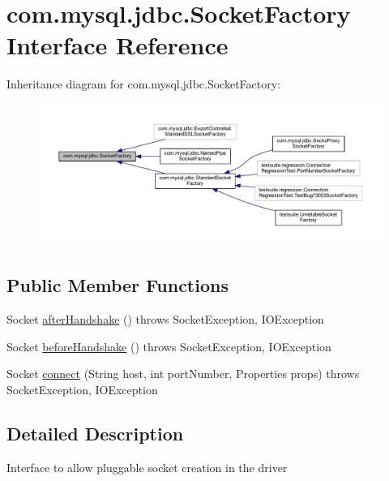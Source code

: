 \hypertarget{interfacecom_1_1mysql_1_1jdbc_1_1_socket_factory}{}\section{com.\+mysql.\+jdbc.\+Socket\+Factory Interface Reference}
\label{interfacecom_1_1mysql_1_1jdbc_1_1_socket_factory}


Inheritance diagram for com.\+mysql.\+jdbc.\+Socket\+Factory\+:
\nopagebreak
\begin{figure}[H]
\begin{center}
\leavevmode
\includegraphics[width=350pt]{interfacecom_1_1mysql_1_1jdbc_1_1_socket_factory__inherit__graph}
\end{center}
\end{figure}
\subsection*{Public Member Functions}
\begin{DoxyCompactItemize}
\item 
Socket \mbox{\hyperlink{interfacecom_1_1mysql_1_1jdbc_1_1_socket_factory_adc5277dd008da61b24261a983202f5bf}{after\+Handshake}} ()  throws Socket\+Exception, I\+O\+Exception
\item 
Socket \mbox{\hyperlink{interfacecom_1_1mysql_1_1jdbc_1_1_socket_factory_aa9a78553a76681f49c734aaa3f8f126b}{before\+Handshake}} ()  throws Socket\+Exception, I\+O\+Exception
\item 
Socket \mbox{\hyperlink{interfacecom_1_1mysql_1_1jdbc_1_1_socket_factory_a2e5061cef1109ab4689437fe177c4ffe}{connect}} (String host, int port\+Number, Properties props)  throws Socket\+Exception, I\+O\+Exception
\end{DoxyCompactItemize}


\subsection{Detailed Description}
Interface to allow pluggable socket creation in the driver 

